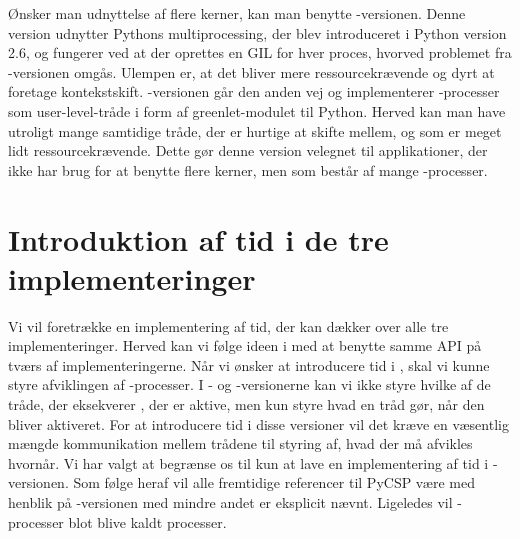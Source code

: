 Ønsker man udnyttelse af flere kerner, kan man benytte -versionen. Denne version udnytter Pythons multiprocessing, der blev introduceret i Python version 2.6, og fungerer ved at der oprettes en GIL for hver proces, hvorved problemet fra -versionen omgås. Ulempen er, at det bliver mere ressourcekrævende og dyrt at foretage kontekstskift.
-versionen går den anden vej og implementerer \csp-processer som user-level-tråde i form af greenlet-modulet til Python\cite{greenlet}. Herved kan man have utroligt mange samtidige tråde, der er hurtige at skifte mellem, og som er meget lidt ressourcekrævende. Dette gør denne version velegnet til applikationer, der ikke har brug for at benytte flere kerner, men som består af mange \csp-processer. 

\section{Introduktion af tid i de tre implementeringer}
Vi vil foretrække en implementering af tid, der kan dækker over alle tre implementeringer. Herved kan vi følge ideen i \pycsp med at benytte samme API på tværs af implementeringerne. Når vi ønsker at introducere tid i \pycsp, skal vi kunne styre afviklingen af \csp-processer. I  - og -versionerne kan vi ikke styre hvilke af de tråde, der eksekverer \csp, der er aktive, men kun styre hvad en tråd gør, når den bliver aktiveret. For at introducere tid i disse versioner vil det kræve en væsentlig mængde kommunikation mellem trådene til styring af, hvad der må afvikles hvornår. Vi har valgt at begrænse os til kun at lave en implementering af tid i -versionen. Som følge heraf vil alle fremtidige referencer til PyCSP være med henblik på -versionen med mindre andet er eksplicit nævnt. Ligeledes vil \csp-processer  blot blive  kaldt  processer. 

